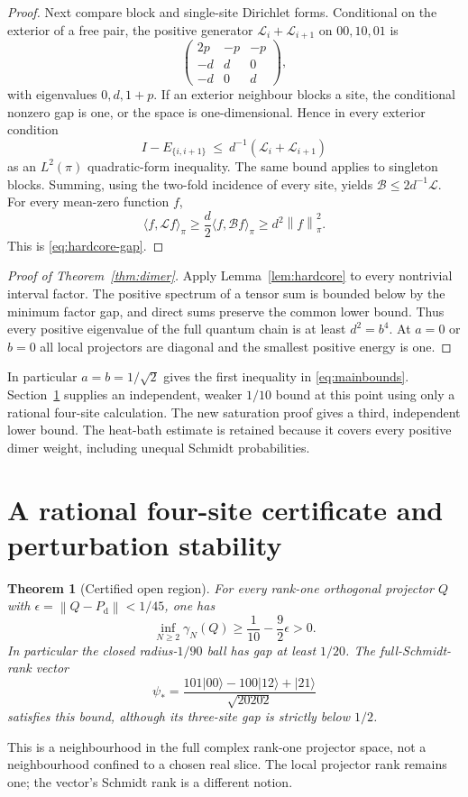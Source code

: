 \documentclass[11pt,a4paper]{article}
\newtheorem{theorem}{Theorem}[section]
\theoremstyle{remark}\newtheorem{remark}[theorem]{Remark}
\newcommand{\ket}[1]{\lvert #1\rangle}
\newcommand{\norm}[1]{\left\lVert #1\right\rVert}
\newcommand{\Pd}{P_{\mathrm d}}
\begin{document}
\begin{proof}
Next compare block and single-site Dirichlet forms. Conditional on the exterior of a free pair, the positive generator $\mathcal L_i+\mathcal L_{i+1}$ on $00,10,01$ is
\[
 \begin{pmatrix}2p&-p&-p\\-d&d&0\\-d&0&d\end{pmatrix},
\]
with eigenvalues $0,d,1+p$. If an exterior neighbour blocks a site, the conditional nonzero gap is one, or the space is one-dimensional. Hence in every exterior condition
\[
 I-E_{\{i,i+1\}}\ \le\ d^{-1}(\mathcal L_i+\mathcal L_{i+1})
\]
as an $L^2(\pi)$ quadratic-form inequality. The same bound applies to singleton blocks. Summing, using the two-fold incidence of every site, yields
$\mathcal B\le2d^{-1}\mathcal L$. For every mean-zero function $f$,
\[
 \langle f,\mathcal Lf\rangle_\pi
 \ge\frac d2\langle f,\mathcal Bf\rangle_\pi
 \ge d^2\norm f_\pi^2.
\]
This is \eqref{eq:hardcore-gap}.
\end{proof}
\begin{proof}[Proof of Theorem~\ref{thm:dimer}]
Apply Lemma~\ref{lem:hardcore} to every nontrivial interval factor. The positive spectrum of a tensor sum is bounded below by the minimum factor gap, and direct sums preserve the common lower bound. Thus every positive eigenvalue of the full quantum chain is at least $d^2=b^4$. At $a=0$ or $b=0$ all local projectors are diagonal and the smallest positive energy is one.
\end{proof}
In particular $a=b=1/\sqrt2$ gives the first inequality in \eqref{eq:mainbounds}. Section~\ref{sec:certificate} supplies an independent, weaker $1/10$ bound at this point using only a rational four-site calculation. The new saturation proof gives a third, independent lower bound. The heat-bath estimate is retained because it covers every positive dimer weight, including unequal Schmidt probabilities.

\section{A rational four-site certificate and perturbation stability}\label{sec:certificate}
\begin{theorem}[Certified open region]\label{thm:ball}
For every rank-one orthogonal projector $Q$ with
$\epsilon=\norm{Q-\Pd}<1/45$, one has
\begin{equation}\label{eq:ball}
 \inf_{N\ge2}\gamma_N(Q)\ge\frac1{10}-\frac92\epsilon>0.
\end{equation}
In particular the closed radius-$1/90$ ball has gap at least $1/20$.
The full-Schmidt-rank vector
\begin{equation}\label{eq:star}
 \psi_* =\frac{101\ket{00}-100\ket{12}+\ket{21}}{\sqrt{20202}}
\end{equation}
satisfies this bound, although its three-site gap is strictly below $1/2$.
\end{theorem}
This is a neighbourhood in the full complex rank-one projector space, not a neighbourhood confined to a chosen real slice. The local projector rank remains one; the vector's Schmidt rank is a different notion.
\end{document}
